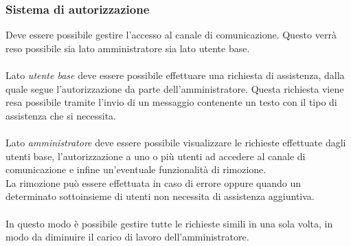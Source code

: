       \subsubsection*{Sistema di autorizzazione}
        Deve essere possibile gestire l'accesso al canale di comunicazione. Questo verrà reso possibile sia lato amministratore sia lato utente base.\\\\
        Lato \textit{utente base} deve essere possibile effettuare una richiesta di assistenza, dalla quale segue l'autorizzazione da parte dell'amministratore. Questa richiesta viene resa possibile tramite l'invio di un messaggio contenente un testo con il tipo di assistenza che si necessita.\\\\
        Lato \textit{amministratore} deve essere possibile visualizzare le richieste effettuate dagli utenti base, l'autorizzazione a uno o più utenti ad accedere al canale di comunicazione e infine un'eventuale funzionalità di rimozione.\\
        La rimozione può essere effettuata in caso di errore oppure quando un determinato sottoinsieme di utenti non necessita di assistenza aggiuntiva.\\\\
        In questo modo è possibile gestire tutte le richieste simili in una sola volta, in modo da diminuire il carico di lavoro dell'amministratore.
